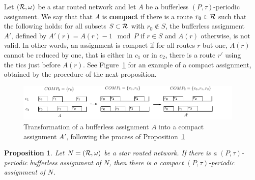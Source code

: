 \documentclass[a4paper,10pt]{article}
\newtheorem{proposition}{Proposition}
\begin{document}
Let $({\cal R},\omega)$ be a star routed network and let $A$ be a bufferless $(P,\tau)$-periodic assignment.
We say that that $A$ is \textbf{compact} if there is a route $r_0 \in \cal{R}$ such that the following holds: for all subsets $S\subset \cal{R}$ with $r_0 \notin S$, the bufferless assignment $A'$, defined by $A'(r) = A(r) - 1 \mod P$ if $r \in S$ and $A(r)$ otherwise, is not valid. In other words, an assignment is compact if for all routes $r$ but one, $A(r)$ cannot be reduced by one, that is either in $c_1$ or in $c_2$, there is a route $r'$ using the tics just before $A(r)$. See Figure~\ref{fig:compact} for an example of a compact assignment, obtained by the procedure of the next proposition. 
  \begin{figure}
      \begin{center} 
      \includegraphics[width=\textwidth]{compacttoassignment.pdf}
      \end{center}
      \caption{Transformation of a bufferless assignment $A$ into a compact assignment $A'$, following the process of Proposition~\ref{prop:compactification}}
      \label{fig:compact}
      \end{figure}
\begin{proposition}\label{prop:compactification}
Let $N = ({\cal R}, \omega)$ be a star routed network. If there is a $(P,\tau)$-periodic bufferless assignment of $N$, then there is a compact $(P,\tau)$-periodic assignment of $N$.
\end{proposition}
\end{document}
